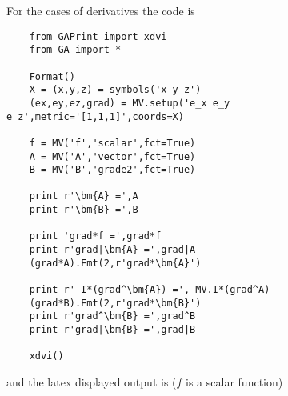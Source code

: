 \documentclass[10pt]{article}
\begin{document}
For the cases of derivatives the code is

\begin{lstlisting}
    from GAPrint import xdvi
    from GA import *

    Format()
    X = (x,y,z) = symbols('x y z')
    (ex,ey,ez,grad) = MV.setup('e_x e_y e_z',metric='[1,1,1]',coords=X)

    f = MV('f','scalar',fct=True)
    A = MV('A','vector',fct=True)
    B = MV('B','grade2',fct=True)

    print r'\bm{A} =',A
    print r'\bm{B} =',B

    print 'grad*f =',grad*f
    print r'grad|\bm{A} =',grad|A
    (grad*A).Fmt(2,r'grad*\bm{A}')

    print r'-I*(grad^\bm{A}) =',-MV.I*(grad^A)
    (grad*B).Fmt(2,r'grad*\bm{B}')
    print r'grad^\bm{B} =',grad^B
    print r'grad|\bm{B} =',grad|B

    xdvi()
\end{lstlisting}

and the latex displayed output is ($f$ is a scalar function)
\end{document}
